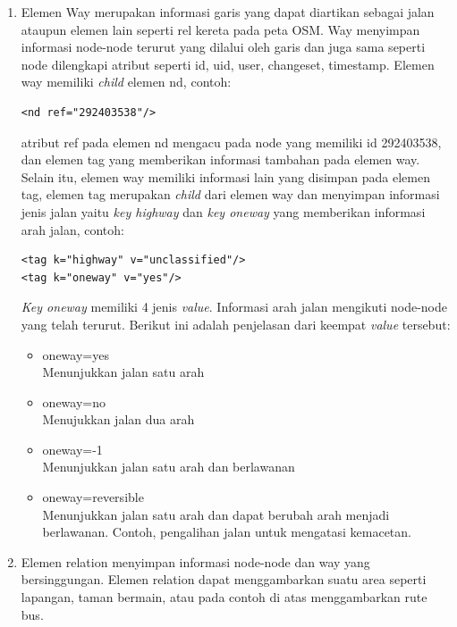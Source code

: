 \begin{itemize}
\begin{enumerate}
\item Elemen Way merupakan informasi garis yang dapat diartikan sebagai jalan
ataupun elemen lain seperti rel kereta pada peta OSM. Way menyimpan informasi
node-node terurut yang dilalui oleh garis dan juga sama seperti node dilengkapi
atribut seperti id, uid, user, changeset, timestamp. Elemen way memiliki \textit{child}
elemen nd, contoh:
\begin{verbatim}
<nd ref="292403538"/>
\end{verbatim}
atribut ref pada elemen nd mengacu pada node yang memiliki id 292403538, dan
elemen tag yang memberikan informasi tambahan pada elemen way. Selain itu,
elemen way memiliki informasi lain yang disimpan pada elemen tag, elemen tag
merupakan \textit{child} dari elemen way dan menyimpan informasi jenis jalan
yaitu \textit{key highway} dan \textit{key oneway} yang memberikan informasi
arah jalan, contoh:
\begin{verbatim}
<tag k="highway" v="unclassified"/>
<tag k="oneway" v="yes"/>
\end{verbatim}
\textit{Key oneway} memiliki 4 jenis \textit{value}. Informasi arah jalan
mengikuti node-node yang telah terurut. Berikut ini adalah
penjelasan dari keempat \textit{value} tersebut:
\begin{itemize}
  \item oneway=yes \\
  Menunjukkan jalan satu arah
  
  \item oneway=no \\
  Menujukkan jalan dua arah
  
  \item oneway=-1 \\
  Menunjukkan jalan satu arah dan berlawanan
  
  \item oneway=reversible \\
  Menunjukkan jalan satu arah dan dapat berubah arah menjadi berlawanan. Contoh,
  pengalihan jalan untuk mengatasi kemacetan.
\end{itemize}

\item Elemen relation menyimpan informasi node-node dan way yang bersinggungan.
Elemen relation dapat menggambarkan suatu area seperti lapangan, taman bermain, atau
pada contoh di atas menggambarkan rute bus.
\end{enumerate}
\end{itemize}

